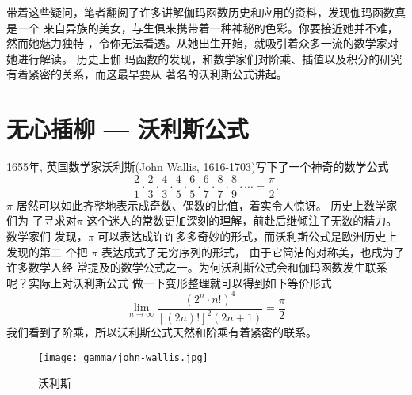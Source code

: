 带着这些疑问，笔者翻阅了许多讲解伽玛函数历史和应用的资料，发现伽玛函数真是一个
来自异族的美女，与生俱来携带着一种神秘的色彩。你要接近她并不难，然而她魅力独特
，令你无法看透。从她出生开始，就吸引着众多一流的数学家对她进行解读。 历史上伽
玛函数的发现，和数学家们对阶乘、插值以及积分的研究有着紧密的关系，而这最早要从
著名的沃利斯公式讲起。

\section{无心插柳 --- 沃利斯公式}

1655年, 英国数学家沃利斯(John Wallis, 1616-1703)写下了一个神奇的数学公式
\begin{equation}
\label{wallis-formula}
\frac{2}{1} \cdot \frac{2}{3} \cdot \frac{4}{3} \cdot \frac{4}{5} \cdot
\frac{6}{5} \cdot \frac{6}{7} \cdot \frac{8}{7} \cdot \frac{8}{9} \cdot \cdots =
\frac{\pi}{2} .
\end{equation}
$\pi$ 居然可以如此齐整地表示成奇数、偶数的比值，着实令人惊讶。 历史上数学家们为
了寻求对$\pi$ 这个迷人的常数更加深刻的理解，前赴后继倾注了无数的精力。数学家们
发现，$\pi$ 可以表达成许许多多奇妙的形式，而沃利斯公式是欧洲历史上发现的第二
个把 $\pi$ 表达成式了无穷序列的形式， 由于它简洁的对称美，也成为了许多数学人经
常提及的数学公式之一。为何沃利斯公式会和伽玛函数发生联系呢？实际上对沃利斯公式
做一下变形整理就可以得到如下等价形式
$$ \lim_{n\rightarrow\infty} \frac{(2^n \cdot n!)^4}{[(2n)!]^2(2n+1)} = \frac{\pi}{2} $$
我们看到了阶乘，所以沃利斯公式天然和阶乘有着紧密的联系。

\begin{figure}[htbp]
\centering
\texttt{[image: gamma/john-wallis.jpg]}
\caption{沃利斯}
\end{figure}

